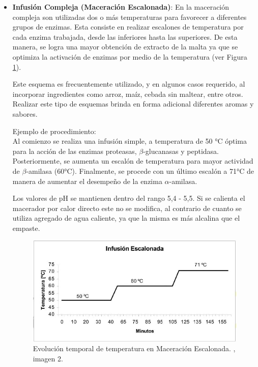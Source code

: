 \begin{itemize}
                    \item \textbf{Infusión Compleja (Maceración Escalonada)}: En la maceración compleja son utilizadas dos o más temperaturas para favorecer a diferentes grupos de enzimas. Esta consiste en realizar escalones de temperatura por cada enzima trabajada, desde las inferiores hasta las superiores. De esta manera, se logra una mayor obtención de extracto de la malta ya que se optimiza la activación de enzimas por medio de la temperatura (ver Figura \ref{MaceracionEscalonada}).
                    
                    \par Este esquema es frecuentemente utilizado, y en algunos casos requerido, al incorporar ingredientes como arroz, maíz, cebada sin maltear, entre otros. Realizar este tipo de esquemas brinda en forma adicional diferentes aromas y sabores.
                    
                    \par Ejemplo de procedimiento: \\ Al comienzo se realiza una infusión simple, a temperatura de 50 °C óptima para la acción de las enzimas proteasas, $\beta$-glucanasas y peptidasa. Posteriormente, se aumenta un escalón de temperatura para mayor actividad de $\beta$-amilasa (60°C). Finalmente, se procede con un último escalón a 71°C de manera de aumentar el desempeño de la enzima $\alpha$-amilasa.
                    
                    \par Los valores de pH se mantienen dentro del rango 5,4 - 5,5. Si se calienta el macerador por calor directo este no se modifica, al contrario de cuanto se utiliza agregado de agua caliente, ya que la misma es más alcalina que el empaste.
                    
                    \begin{figure} [H]		                                                            \centerline{\includegraphics[scale=0.7]{maceracion_escalonada.jpg}}
                        \caption{Evolución temporal de temperatura en Maceración Escalonada. \cite{Ceresvis}, imagen 2.}
                        \label{MaceracionEscalonada}
                    \end{figure}
                    
                \end{itemize}
                
